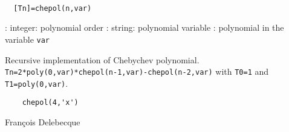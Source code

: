 
\begin{mandesc}
   \\ %
\end{mandesc}
\begin{calling_sequence}
\begin{verbatim}
  [Tn]=chepol(n,var)  
\end{verbatim}
\end{calling_sequence}
\begin{parameters}
  \begin{varlist}
    : integer: polynomial order
    : string: polynomial variable
    : polynomial in the variable \verb!var!
  \end{varlist}
\end{parameters}
\begin{mandescription}
  Recursive implementation of Chebychev polynomial.
  \verb!Tn=2*poly(0,var)*chepol(n-1,var)-chepol(n-2,var)! with
  \verb!T0=1! and \verb!T1=poly(0,var)!.
\end{mandescription}
\begin{examples}
  \begin{Verbatim}
    chepol(4,'x')
  \end{Verbatim}
\end{examples}
\begin{authors}
  Fran\c{c}ois  Delebecque  
\end{authors}
